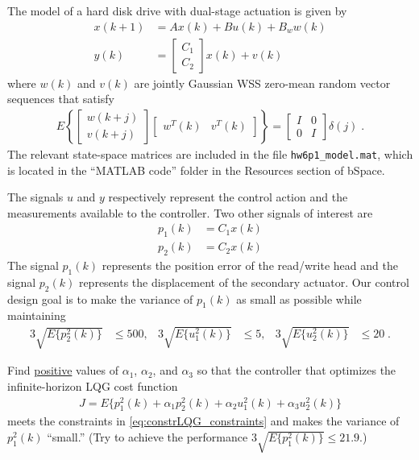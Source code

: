 \item
The model of a hard disk drive with dual-stage actuation is given by
\begin{align*}
    x(k+1) & = Ax(k) + Bu(k) + B_w w(k) \\
    y(k) & = \begin{bmatrix}
            C_1 \\
            C_2
        \end{bmatrix} x(k) + v(k)
\end{align*}
where $w(k)$ and $v(k)$ are jointly Gaussian WSS zero-mean random vector sequences that satisfy
\begin{align*}
    E \left\{ \begin{bmatrix}
            w(k+j) \\
            v(k+j)
        \end{bmatrix} \begin{bmatrix}
            w^T(k) & v^T(k)
        \end{bmatrix} \right\} = \begin{bmatrix}
            I & 0 \\
            0 & I
        \end{bmatrix} \delta(j) \; .
\end{align*}
The relevant state-space matrices are included in the file \verb|hw6p1_model.mat|, which is located in the ``MATLAB code'' folder in the Resources section of bSpace.

The signals $u$ and $y$ respectively represent the control action and the measurements available to the controller. Two other signals of interest are
\begin{align*}
        p_1(k) & = C_1 x(k) \\
        p_2(k) & = C_2 x(k)
\end{align*}
The signal $p_1(k)$ represents the position error of the read/write head and the signal $p_2(k)$ represents the displacement of the secondary actuator. Our control design goal is to make the variance of $p_1(k)$ as small as possible while maintaining
\begin{align}
    3\sqrt{ E \{ p_2^2(k) \} } & \leq 500,
        & 3\sqrt{ E \{ u_1^2(k) \} }& \leq 5,
        & 3\sqrt{E \{ u_2^2(k) \} } & \leq 20 \; .
        \label{eq:constrLQG_constraints}
\end{align}

Find \underline{positive} values of $\alpha_1$, $\alpha_2$, and $\alpha_3$ so that the controller that optimizes the infinite-horizon LQG cost function
\begin{align*}
    J = E \{ p_1^2(k) + \alpha_1 p_2^2(k) + \alpha_2 u_1^2(k) + \alpha_3 u_2^2(k) \}
\end{align*}
meets the constraints in \eqref{eq:constrLQG_constraints} and makes the variance of $p_1^2(k)$ ``small.'' (Try to achieve the performance  $3\sqrt{ E \{ p_1^2(k) \} } \leq 21.9$.)

